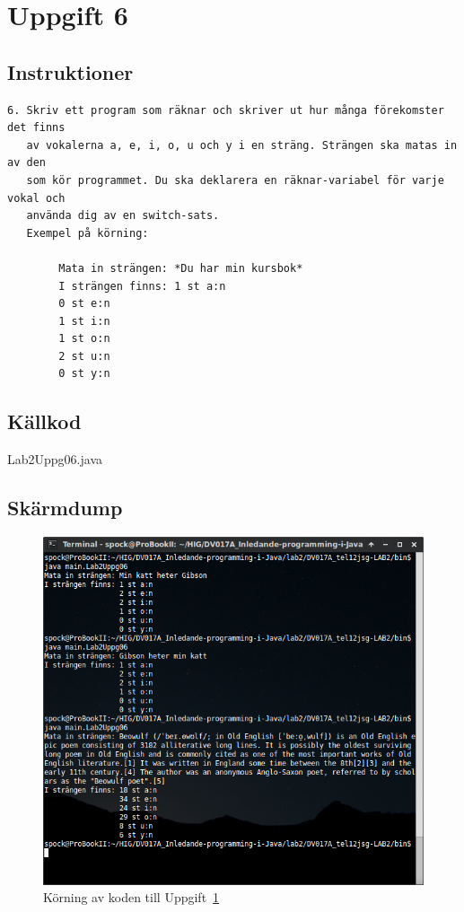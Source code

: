 \section{Uppgift 6}\label{sec:uppg06}

\subsection{Instruktioner}
\begin{verbatim}
6. Skriv ett program som räknar och skriver ut hur många förekomster det finns
   av vokalerna a, e, i, o, u och y i en sträng. Strängen ska matas in av den
   som kör programmet. Du ska deklarera en räknar-variabel för varje vokal och
   använda dig av en switch-sats.
   Exempel på körning:

        Mata in strängen: *Du har min kursbok*
        I strängen finns: 1 st a:n
        0 st e:n
        1 st i:n
        1 st o:n
        2 st u:n
        0 st y:n
\end{verbatim}


\subsection{Källkod}
\caption{Lab2Uppg06.java}
\label{src:uppg06}


\subsection{Skärmdump}
\begin{figure}[htbp]
    \centering
        \includegraphics[width=\linewidth]{img/06.png}
    \caption{Körning av koden till Uppgift~\ref{sec:uppg06}}
    \label{fig:uppg06-screenshot}
\end{figure}

